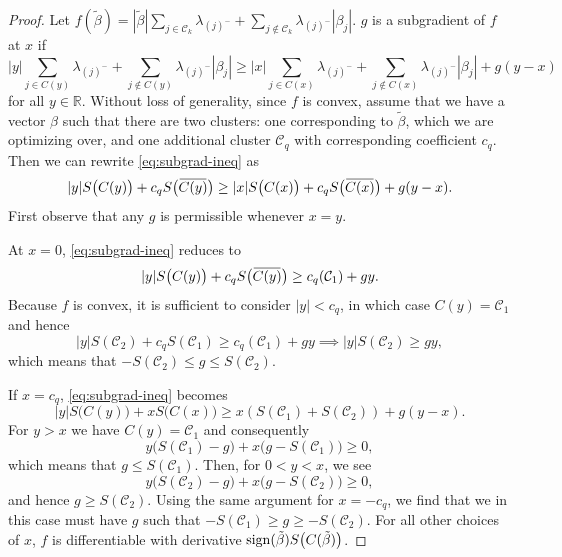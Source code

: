 \begin{proof}
  Let \(f(\tilde\beta) = |\tilde\beta|\sum_{j \in \mathcal{C}_k}\lambda_{(j)^-} + \sum_{j \notin \mathcal{C}_k} \lambda_{(j)^-}|\beta_j|\).
  \(g\) is a subgradient of \(f\) at \(x\) if
  \begin{equation}
    \label{eq:subgrad-ineq}
    |y|\sum_{j \in C(y)}\lambda_{(j)^-} + \sum_{j \notin C(y)}\lambda_{(j)^-}|\beta_j|
    \geq |x|\sum_{j \in C(x)} \lambda_{(j)^-} + \sum_{j \notin C(x)}\lambda_{(j)^-}|\beta_j| + g(y - x)
  \end{equation}
  for all \(y \in \mathbb{R}\).
  Without loss of generality, since \(f\) is convex, assume that we have
  a vector \(\beta\) such that there are two clusters: one corresponding
  to \(\tilde\beta\), which we are optimizing over, and
  one additional cluster \(\mathcal{C}_q\) with corresponding
  coefficient \(c_q\).
  Then we can rewrite \eqref{eq:subgrad-ineq} as
  \[
    |y|S\big(C(y)\big) + c_q S\big(\widebar{C(y)}\big) \geq
    |x| S\big(C(x)\big) + c_q S\big(\widebar{C(x)}\big) + g(y - x).
  \]
  First observe that any \(g\) is permissible whenever \(x = y\).

  At \(x = 0\), \eqref{eq:subgrad-ineq} reduces to
  \[
    |y|S\big(C(y)\big) + c_q S\big(\widebar{C(y)}\big)
    \geq c_q(\mathcal{C}_1) + gy.
  \]
  Because \(f\) is convex, it is sufficient to consider \(|y| < c_q\),
  in which case \(C(y) = \mathcal{C}_1\) and hence
  \begin{equation}
      |y|S(\mathcal{C}_2) + c_q S(\mathcal{C}_1) \geq c_q(\mathcal{C}_1) + gy \implies
      |y|S(\mathcal{C}_2) \geq gy,
  \end{equation}
  which means that \(-S(\mathcal{C}_2) \leq g \leq S(\mathcal{C}_2)\).

  If \(x = c_q\), \eqref{eq:subgrad-ineq} becomes
  \[
    |y|S\big(C(y)\big) + x S\big(C(x)\big) \geq x(S(\mathcal{C}_1) + S(\mathcal{C}_2)) + g(y - x).
  \]
  For \(y > x\) we have \(C(y) = \mathcal{C}_1\) and consequently
  \[
    y\big(S(\mathcal{C}_1) - g\big) + x\big(g - S(\mathcal{C}_1)\big) \geq 0,
  \]
  which means that \(g \leq S(\mathcal{C}_1)\).
  Then, for \(0 < y < x\), we see
  \[
    y\big(S(\mathcal{C}_2) - g\big) + x(g - S(\mathcal{C}_2)\big) \geq 0,
  \]
  and hence \(g \geq S(\mathcal{C}_2)\).
  Using the same argument for \(x = -c_q\), we find that we in this case
  must have \(g\) such that
  \(-S(\mathcal{C}_1) \geq g \geq - S(\mathcal{C}_2)\).
  For all other choices of \(x\), \(f\) is differentiable with
  derivative \(\operatorname{sign}(\tilde\beta)S\big(C(\tilde\beta)\big)\).
\end{proof}

